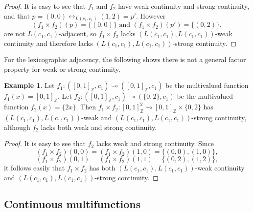 \documentclass{article}
\theoremstyle{plain}
\theoremstyle{definition}
\newtheorem{exl}[thm]{Example}
\numberwithin{thm}{section}
\newcommand{\adj}{\leftrightarrow}
\def\Z{{\mathbb Z}}
\begin{document}
\begin{proof} It is easy to see
that $f_1$ and $f_2$ have weak continuity and strong continuity, and that
$p=(0,0) \adj_{L(c_1,c_1)} (1,2)=p'$. However
\[ (f_1 \times f_2)(p)= \{(0,0)\}
\mbox{ and }
 (f_1 \times f_2)(p')= \{(0,2)\},
\]
are not $L(c_1,c_1)$-adjacent, so
$f_1 \times f_2$ lacks $(L(c_1,c_1),L(c_1,c_1))$-weak continuity and therefore lacks 
$(L(c_1,c_1),L(c_1,c_1))$-strong continuity.
\end{proof}

For the lexicographic adjacency,
the following shows there is not a
general factor property for
weak or strong continuity.

\begin{exl}
\label{lex-weakStrong-factor-exl}
Let $f_1: ([0,1]_{\Z}, c_1) \multimap ([0,1]_{\Z}, c_1)$
be the multivalued function
$f_1(x)= [0,1]_{\Z}$. Let
$f_2: ([0,1]_{\Z}, c_1) \multimap (\{0,2\}, c_1)$ be
the multivalued function
$f_2(x) = \{2x\}$. Then
$f_1 \times f_2: [0,1]_{\Z}^2 \multimap [0,1]_{\Z} \times \{0,2\}$ has $(L(c_1,c_1),L(c_1,c_1))$-weak and $(L(c_1,c_1),L(c_1,c_1))$-strong continuity, although
$f_2$ lacks both weak and strong continuity.
\end{exl}

\begin{proof}
It is easy to see that $f_2$ lacks weak and strong continuity. Since 
\[ (f_1 \times f_2)(0,0)=(f_1 \times f_2)(1,0)=\{(0,0), (1,0)\},
\]
\[ (f_1 \times f_2)(0,1)=(f_1 \times f_2)(1,1)=\{(0,2),(1,2)\},
\]
it follows easily that $f_1 \times f_2$ has both
$(L(c_1,c_1),L(c_1,c_1))$-weak continuity and $(L(c_1,c_1),L(c_1,c_1))$-strong continuity.
\end{proof}

\subsection{Continuous multifunctions}
\begin{comment}
\begin{figure}
\caption{The digital image
$X=[0,2]_{\Z}\times [0,1]_{\Z}$ with
its partitions $S(X,2)$ with member coordinates on heavy lines, and $S(X,6)$
with member coordinates on both heavy and light lines. In the notation used in the proof of
Lemma~\ref{gcm-subdiv}, we have,
e.g., $I(7/6,2/3)=(1,1/2)$.
}
\label{partitions-fig}
\end{figure}
\end{comment}
\end{document}
